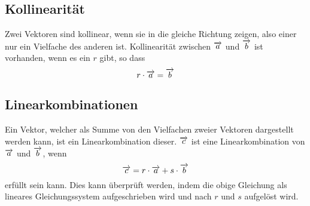 \documentclass{article}
\begin{document}
\subsection{Kollinearität} 
Zwei Vektoren sind kollinear, wenn sie in die gleiche Richtung zeigen, also einer nur ein Vielfache des anderen ist. Kollinearität zwischen $\overrightarrow{a}$ und $\overrightarrow{b}$ ist vorhanden, wenn es ein $r$ gibt, so dass 
\[ 
 r \cdot \overrightarrow{a} = \overrightarrow{b}
\]
 
\subsection{Linearkombinationen} 
Ein Vektor, welcher als Summe von den Vielfachen zweier Vektoren dargestellt werden kann, ist ein Linearkombination dieser. $\overrightarrow{c}$ ist eine Linearkombination von $\overrightarrow{a}$ und $\overrightarrow{b}$, wenn
\[
 \overrightarrow{c} = r \cdot \overrightarrow{a} + s \cdot \overrightarrow{b} 
\]
erfüllt sein kann. Dies kann überprüft werden, indem die obige Gleichung als lineares Gleichungssystem aufgeschrieben wird  und nach $r$ und $s$ aufgelöst wird.
 
\end{document}

